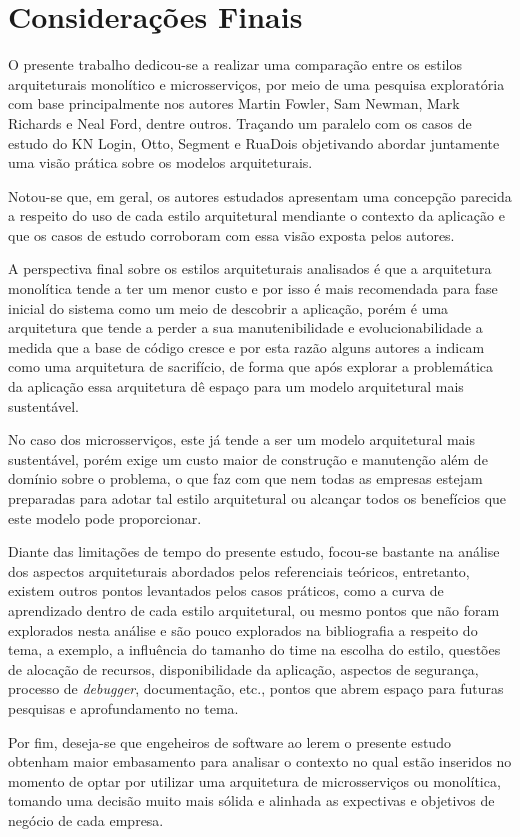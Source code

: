 \chapter{Considerações Finais}

O presente trabalho dedicou-se a realizar uma comparação entre os estilos arquiteturais monolítico e
microsserviços, por meio de uma pesquisa exploratória com base principalmente nos autores Martin Fowler,
Sam Newman, Mark Richards e Neal Ford, dentre outros. Traçando um paralelo com os casos de estudo do
KN Login, Otto, Segment e RuaDois objetivando abordar juntamente uma visão prática sobre os modelos
arquiteturais.

Notou-se que, em geral, os autores estudados apresentam uma concepção parecida a respeito do
uso de cada estilo arquitetural mendiante o contexto da aplicação e que os casos de estudo
corroboram com essa visão exposta pelos autores.

A perspectiva final sobre os estilos arquiteturais analisados é que a arquitetura monolítica tende a
ter um menor custo e por isso é mais recomendada para fase inicial do sistema como um meio de
descobrir a aplicação, porém é uma arquitetura que tende a perder a sua manutenibilidade e
evolucionabilidade a medida que a base de código cresce e por esta razão alguns autores a indicam como uma
arquitetura de sacrifício, de forma que após explorar a problemática da aplicação essa arquitetura
dê espaço para um modelo arquitetural mais sustentável.

No caso dos microsserviços, este já tende a ser um modelo arquitetural mais sustentável, porém exige
um custo maior de construção e manutenção além de domínio sobre o problema, o que faz com que nem todas
as empresas estejam preparadas para adotar tal estilo arquitetural ou alcançar todos os benefícios
que este modelo pode proporcionar.

Diante das limitações de tempo do presente estudo, focou-se bastante na análise dos aspectos
arquiteturais abordados pelos referenciais teóricos, entretanto, existem outros pontos levantados
pelos casos práticos, como a curva de aprendizado dentro de cada estilo arquitetural, ou mesmo pontos que
não foram explorados nesta análise e são pouco explorados na bibliografia a respeito do tema, a exemplo,
a influência do tamanho do time na escolha do estilo, questões de alocação de recursos, disponibilidade
da aplicação, aspectos de segurança, processo de \textit{debugger}, documentação, etc., pontos que abrem
espaço para futuras pesquisas e aprofundamento no tema.

Por fim, deseja-se que engeheiros de software ao lerem o presente estudo obtenham maior embasamento
para analisar o contexto no qual estão inseridos no momento de optar por utilizar uma arquitetura de
microsserviços ou monolítica, tomando uma decisão muito mais sólida e alinhada as expectivas e objetivos
de negócio de cada empresa.
